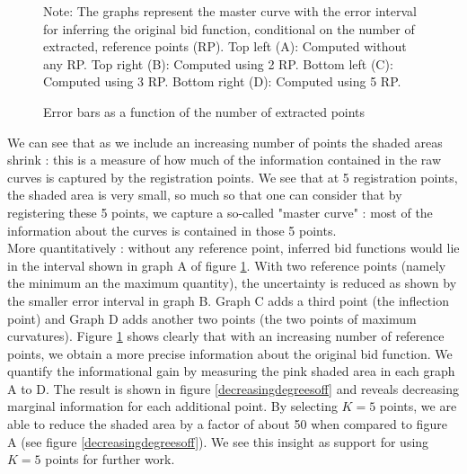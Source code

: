 \begin{figure}[!ht]
\begin{center}
{}
\caption{Error bars as a function of the number of extracted points}
\label{errorbarsasfunction}
\end{center}
{ \small Note: The graphs represent the master curve with the error interval for inferring the original bid function, conditional on the number of extracted, reference  points (RP). Top left (A): Computed without any RP. Top right (B): Computed using 2 RP. Bottom left (C): Computed using 3 RP. Bottom right (D): Computed using 5 RP. } 
\end{figure}

We can see that as we include an increasing number of points the shaded areas shrink : this is a measure of how much of the information contained in the raw curves is captured by the registration points. We see that at 5 registration points, the shaded area is very small, so much so that one can consider that by registering these 5 points, we capture a so-called "master curve" : most of the information about the curves is contained in those 5 points.\\

More quantitatively : without any reference point, inferred bid functions would lie in the interval shown in graph A of figure \ref{errorbarsasfunction}. With two reference points (namely the minimum an the maximum quantity), the uncertainty is reduced as shown by the smaller error interval in graph B. Graph C adds a third point (the inflection point) and Graph D adds another two points (the two points of maximum curvatures). Figure \ref{errorbarsasfunction} shows clearly that with an increasing number of reference points, we obtain a more precise information about the original bid function. We quantify the informational gain by measuring the pink shaded area in each graph A to D. The result is shown in figure \ref{decreasingdegreesoff} and reveals decreasing marginal information for each additional point. By selecting $K=5$ points, we are able to reduce the shaded area by a factor of about 50 when compared to figure A (see figure \ref{decreasingdegreesoff}). We see this insight as support for using $K=5$ points for further work. \\


